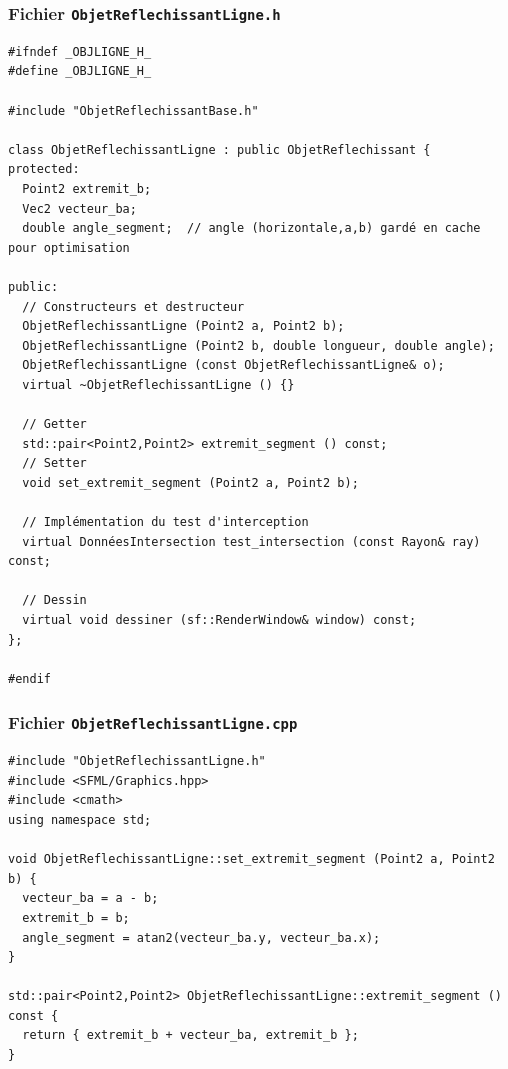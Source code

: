 \documentclass{book}
\def\filename{\texttt}
\begin{document}
\begin{correction}

\subsubsection*{Fichier \filename{ObjetReflechissantLigne.h}}

\begin{verbatim}
#ifndef _OBJLIGNE_H_
#define _OBJLIGNE_H_

#include "ObjetReflechissantBase.h"

class ObjetReflechissantLigne : public ObjetReflechissant {
protected:
  Point2 extremit_b;
  Vec2 vecteur_ba;
  double angle_segment;  // angle (horizontale,a,b) gardé en cache pour optimisation

public:
  // Constructeurs et destructeur
  ObjetReflechissantLigne (Point2 a, Point2 b);
  ObjetReflechissantLigne (Point2 b, double longueur, double angle);
  ObjetReflechissantLigne (const ObjetReflechissantLigne& o);
  virtual ~ObjetReflechissantLigne () {}

  // Getter
  std::pair<Point2,Point2> extremit_segment () const;
  // Setter
  void set_extremit_segment (Point2 a, Point2 b);

  // Implémentation du test d'interception
  virtual DonnéesIntersection test_intersection (const Rayon& ray) const;

  // Dessin
  virtual void dessiner (sf::RenderWindow& window) const;
};

#endif
\end{verbatim}

\subsubsection*{Fichier \filename{ObjetReflechissantLigne.cpp}}

\begin{verbatim}
#include "ObjetReflechissantLigne.h"
#include <SFML/Graphics.hpp>
#include <cmath>
using namespace std;

void ObjetReflechissantLigne::set_extremit_segment (Point2 a, Point2 b) {
  vecteur_ba = a - b;
  extremit_b = b;
  angle_segment = atan2(vecteur_ba.y, vecteur_ba.x);
}

std::pair<Point2,Point2> ObjetReflechissantLigne::extremit_segment () const {
  return { extremit_b + vecteur_ba, extremit_b };
}


\end{verbatim}
\end{correction}
\end{document}
